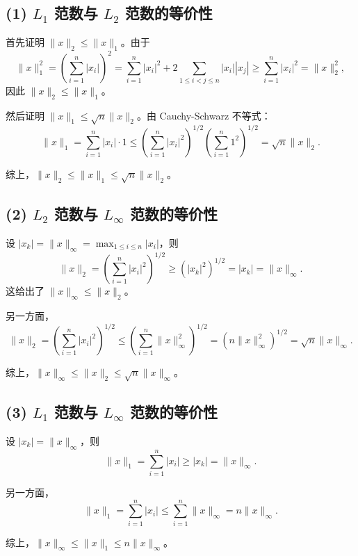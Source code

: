 \documentclass{article}
\begin{document}
\begin{solution}
  \subsection*{(1) $L_1$ 范数与 $L_2$ 范数的等价性}

  首先证明 $\|x\|_2 \leq \|x\|_1$。由于
  \[
    \|x\|_1^2 = \left( \sum_{i=1}^{n} |x_i| \right)^2 =
    \sum_{i=1}^{n} |x_i|^2 + 2 \sum_{1 \leq i < j \leq n} |x_i||x_j|
    \geq \sum_{i=1}^{n} |x_i|^2 = \|x\|_2^2,
  \]
  因此 $\|x\|_2 \leq \|x\|_1$。

  然后证明 $\|x\|_1 \leq \sqrt{n} \|x\|_2$。由 Cauchy-Schwarz 不等式：
  \[
    \|x\|_1 = \sum_{i=1}^{n} |x_i| \cdot 1 \leq \left( \sum_{i=1}^{n}
    |x_i|^2 \right)^{1/2} \left( \sum_{i=1}^{n} 1^2 \right)^{1/2} =
    \sqrt{n} \|x\|_2.
  \]

  综上，$\|x\|_2 \leq \|x\|_1 \leq \sqrt{n} \|x\|_2$。

  \subsection*{(2) $L_2$ 范数与 $L_\infty$ 范数的等价性}

  设 $|x_k| = \|x\|_\infty = \max_{1 \leq i \leq n} |x_i|$，则
  \[
    \|x\|_2 = \left( \sum_{i=1}^{n} |x_i|^2 \right)^{1/2} \geq \left(
    |x_k|^2 \right)^{1/2} = |x_k| = \|x\|_\infty.
  \]
  这给出了 $\|x\|_\infty \leq \|x\|_2$。

  另一方面，
  \[
    \|x\|_2 = \left( \sum_{i=1}^{n} |x_i|^2 \right)^{1/2} \leq \left(
    \sum_{i=1}^{n} \|x\|_\infty^2 \right)^{1/2} = \left( n
    \|x\|_\infty^2 \right)^{1/2} = \sqrt{n} \|x\|_\infty.
  \]

  综上，$\|x\|_\infty \leq \|x\|_2 \leq \sqrt{n} \|x\|_\infty$。

  \subsection*{(3) $L_1$ 范数与 $L_\infty$ 范数的等价性}

  设 $|x_k| = \|x\|_\infty$，则
  \[
    \|x\|_1 = \sum_{i=1}^{n} |x_i| \geq |x_k| = \|x\|_\infty.
  \]

  另一方面，
  \[
    \|x\|_1 = \sum_{i=1}^{n} |x_i| \leq \sum_{i=1}^{n} \|x\|_\infty =
    n \|x\|_\infty.
  \]

  综上，$\|x\|_\infty \leq \|x\|_1 \leq n \|x\|_\infty$。

\end{solution}
\end{document}
